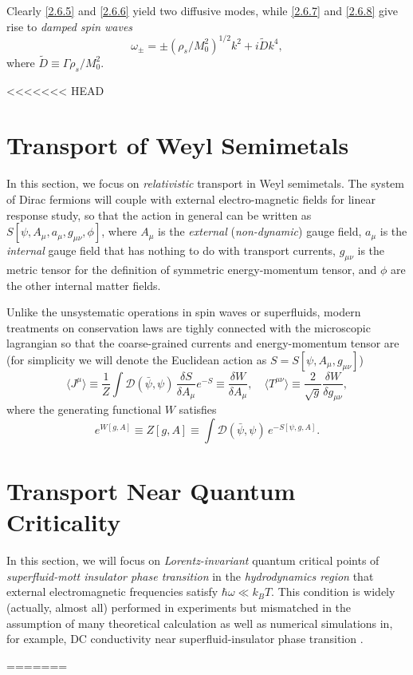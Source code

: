 \documentclass[10pt,nofootinbib,letterpaper]{revtex4}
\begin{document}
		Clearly \eqref{2.6.5} and \eqref{2.6.6} yield two diffusive modes, while \eqref{2.6.7} and \eqref{2.6.8} give rise to \emph{damped spin waves}
		\begin{equation}\label{2.6.9}
			\omega_\pm=\pm(\rho_s/M_0^2)^{1/2}k^2+i \widetilde{D}k^4, 
		\end{equation}
		where $\widetilde{D}\equiv\Gamma\rho_s/M_0^2$.

<<<<<<< HEAD

\section{Transport of Weyl Semimetals}
	In this section, we focus on \emph{relativistic} transport in Weyl semimetals. The system of Dirac fermions will couple with external electro-magnetic fields for linear response study, so that the action in general can be written as $S[\psi,A_\mu,a_\mu,g_{\mu\nu},\phi]$, where $A_\mu$ is the \emph{external} (\emph{non-dynamic}) gauge field, $a_\mu$ is the \emph{internal} gauge field that has nothing to do with transport currents, $g_{\mu\nu}$ is the metric tensor for the definition of symmetric energy-momentum tensor, and $\phi$ are the other internal matter fields.\par
	Unlike the unsystematic operations in spin waves or superfluids, modern treatments on conservation laws are tighly connected with the microscopic lagrangian so that the coarse-grained currents and energy-momentum tensor are (for simplicity we will denote the Euclidean action as $S=S[\psi,A_\mu,g_{\mu\nu}]$)
	\begin{equation}\label{3.1.1}
		\langle J^\mu\rangle\equiv\dfrac{1}{Z}\int\mathcal{D}(\bar{\psi},\psi)\,\dfrac{\delta S}{\delta A_\mu}e^{-S}\equiv\dfrac{\delta W}{\delta A_\mu},\quad \langle T^{\mu\nu} \rangle\equiv\dfrac{2}{\sqrt{g}}\dfrac{\delta W}{\delta g_{\mu\nu}},
	\end{equation}
	where the generating functional $W$ satisfies
	\begin{equation*}
		e^{W[g,A]}\equiv Z[g,A]\equiv\int\mathcal{D}(\bar{\psi},\psi)\,e^{-S[\psi,g,A]}.
	\end{equation*}

\section{Transport Near Quantum Criticality}
	In this section, we will focus on \emph{Lorentz-invariant} quantum critical points of \emph{superfluid-mott insulator phase transition} in the \emph{hydrodynamics region} that external electromagnetic frequencies satisfy $\hbar\omega\ll k_B T$. This condition is widely (actually, almost all) performed in experiments but mismatched in the assumption of many theoretical calculation as well as numerical simulations in, for example, DC conductivity near superfluid-insulator phase transition \cite{damle1997nonzero}.\par
=======
\end{document}
